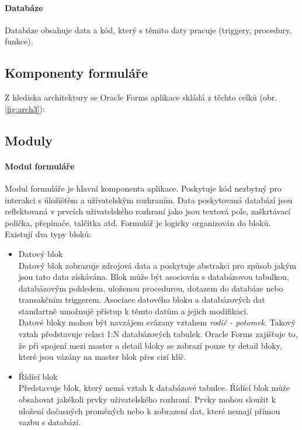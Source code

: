 \documentclass{diplomka}
\begin{document}
\paragraph{Databáze}
Databáze obsahuje data a kód, který s těmito daty pracuje (triggery, procedury, funkce). 

\newpage
\subsection{Komponenty formuláře}
\label{components}
Z hlediska architektury se Oracle Forms aplikace skládá z těchto celků (obr. \ref{fig:arch3}):

\subsection*{Moduly}

\paragraph{Modul formuláře} 
Modul formuláře je hlavní komponenta aplikace. Poskytuje kód nezbytný pro interakci s úložištěm a uživatelským rozhraním. 
Data poskytovaná databází jsou reflektovaná v prvcích uživatelského rozhraní jako jsou textová pole, zaškrtávací políčka, přepínače, talčítka atd. Formulář je logicky organizován do bloků. Existují dva typy bloků: 
\begin{itemize}
\item Datový blok\\ Datový blok zobrazuje zdrojová data a poskytuje abstrakci pro způsob jakým jsou tato data získávána. Blok může být asociován s databázovou tabulkou, databázovým pohledem, uloženou procedurou, dotazem do databáze nebo transakčním triggerem. Asociace datového bloku a databázových dat standartně umožnujě přístup k těmto datům a jejich modifikaci.\\ \indent
Datové bloky mohou být navzájem svázany vztahem \emph{rodič - potomek}. Takový vztah představuje relaci 1:N databázových tabulek. Oracle Forms zajišťuje to, že při spojení mezi master a detail bloky se zobrazí pouze ty detail bloky, které jsou vázány na master blok přes cizí klíč. 

\item Řídící blok \\
Představuje blok, který nemá vztah k databázové tabulce. Řídící blok může obsahovat jakékoli prvky uživatelského rozhraní. Prvky mohou sloužit k uložení dočasných proměných nebo k zobrazení dat, které nemají přímou vazbu s databází. 
\end{itemize}
\end{document}
